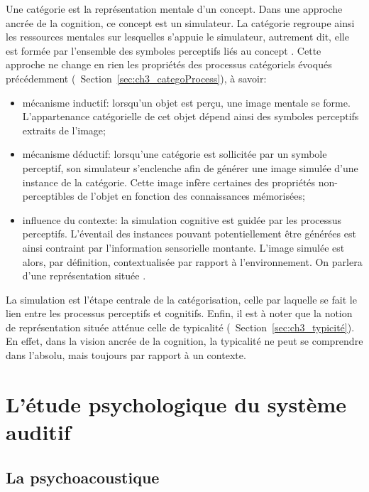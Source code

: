 Une catégorie est la représentation mentale d'un concept. Dans une approche ancrée de la cognition, ce concept est un simulateur. La catégorie regroupe ainsi les ressources mentales sur lesquelles s'appuie le simulateur, autrement dit, elle est formée par l'ensemble des symboles perceptifs liés au concept \citep{barsalou2003situated}. Cette approche ne change en rien les propriétés des processus catégoriels évoqués précédemment (\cf~Section~\ref{sec:ch3_categoProcess}), à savoir:

\begin{itemize}
\item mécanisme inductif: lorsqu'un objet est perçu, une image mentale se forme. L'appartenance catégorielle de cet objet dépend ainsi des symboles perceptifs extraits de l'image;
\item mécanisme déductif: lorsqu'une catégorie est sollicitée par un symbole perceptif, son simulateur s'enclenche afin de générer une image simulée d'une instance de la catégorie. Cette image infère certaines des propriétés non-perceptibles de l'objet en fonction des connaissances mémorisées;
\item influence du contexte: la simulation cognitive est guidée par les processus perceptifs. L'éventail des instances pouvant potentiellement être générées est ainsi contraint par l'information sensorielle montante. L'image simulée est alors, par définition, contextualisée par rapport à l'environnement. On parlera d'une représentation située \citep{barsalou2003situated,barsalou2005situating}.
\end{itemize}

La simulation est l'étape centrale de la catégorisation, celle par laquelle se fait le lien entre les processus perceptifs et cognitifs. Enfin, il est à noter que la notion de représentation située atténue celle de typicalité (\cf~Section~\ref{sec:ch3_typicité}). En effet, dans la vision ancrée de la cognition, la typicalité ne peut se comprendre dans l'absolu, mais toujours par rapport à un contexte.

\section{L'étude psychologique du système auditif}

\subsection{La psychoacoustique}

